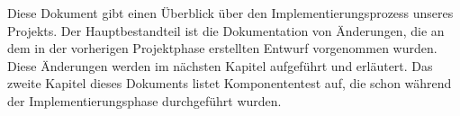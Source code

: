 Diese Dokument gibt einen Überblick über den Implementierungsprozess unseres Projekts. Der Hauptbestandteil ist die Dokumentation von Änderungen, die an dem in der vorherigen Projektphase erstellten Entwurf vorgenommen wurden.
Diese Änderungen werden im nächsten Kapitel aufgeführt und erläutert.
Das zweite Kapitel dieses Dokuments listet Komponententest auf, die schon während der Implementierungsphase durchgeführt wurden.